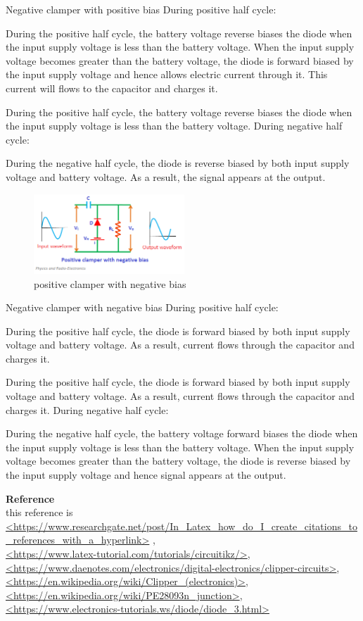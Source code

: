 \documentclass{article}
\begin{document}
Negative clamper with positive bias
During positive half cycle:

During the positive half cycle, the battery voltage reverse biases the diode when the input supply voltage is less than the battery voltage. When the input supply voltage becomes greater than the battery voltage, the diode is forward biased by the input supply voltage and hence allows electric current through it. This current will flows to the capacitor and charges it.

During the positive half cycle, the battery voltage reverse biases the diode when the input supply voltage is less than the battery voltage. 
During negative half cycle:

During the negative half cycle, the diode is reverse biased by both input supply voltage and battery voltage. As a result, the signal appears at the output.
\begin{figure}[H]
	\centering
	\includegraphics[height=3cm]{positiveclamperwithnegativebias.png}
	\caption{positive clamper with negative bias}
\end{figure}

Negative clamper with negative bias
During positive half cycle:

During the positive half cycle, the diode is forward biased by both input supply voltage and battery voltage. As a result, current flows through the capacitor and charges it.

During the positive half cycle, the diode is forward biased by both input supply voltage and battery voltage. As a result, current flows through the capacitor and charges it.
During negative half cycle:

During the negative half cycle, the battery voltage forward biases the diode when the input supply voltage is less than the battery voltage. When the input supply voltage becomes greater than the battery voltage, the diode is reverse biased by the input supply voltage and hence signal appears at the output.
\clearpage

\newpage
\textbf{\huge Reference}\\
this reference is
\url{<https://www.researchgate.net/post/In_Latex_how_do_I_create_citations_to_references_with_a_hyperlink>}	
,\\ 
\url{<https://www.latex-tutorial.com/tutorials/circuitikz/>},\\\url{<https://www.daenotes.com/electronics/digital-electronics/clipper-circuits>},\\ \url{<https://en.wikipedia.org/wiki/Clipper_(electronics)>},\\ \url{<https://en.wikipedia.org/wiki/PE28093n_junction>},\\ \url{<https://www.electronics-tutorials.ws/diode/diode_3.html>}

	
\end{document}
